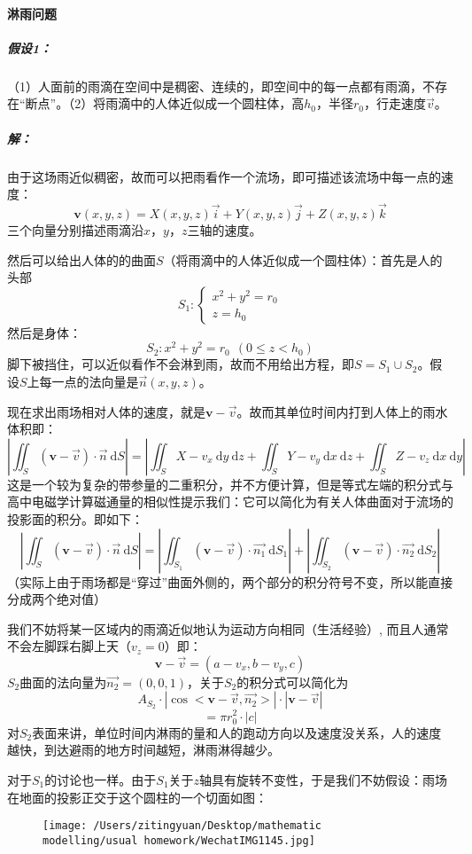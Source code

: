 \documentclass[UTF8]{ctexart}
\newcommand{\df}{\mathrm{~d}}
\begin{document}
\paragraph{淋雨问题}

\subparagraph{假设1：}（1）人面前的雨滴在空间中是稠密、连续的，即空间中的每一点都有雨滴，不存在“断点”。（2）将雨滴中的人体近似成一个圆柱体，高$h_0$，半径$r_0$，行走速度$\vec{v}$。

\subparagraph{解：}由于这场雨近似稠密，故而可以把雨看作一个流场，即可描述该流场中每一点的速度：
$$\mathbf{v}(x,y,z)=X(x,y,z)\vec{i}+Y(x,y,z)\vec{j}+Z(x,y,z)\vec{k}$$
三个向量分别描述雨滴沿$x$，$y$，$z$三轴的速度。

然后可以给出人体的的曲面$S$（将雨滴中的人体近似成一个圆柱体）：首先是人的头部
$$
S_1 :
\begin{cases}
    x^2+y^2=r_0\\
    z=h_0
\end{cases}
$$
然后是身体：
$$
S_2:
x^2+y^2=r_0 ~~ (0 \leqslant z < h_0)
$$
脚下被挡住，可以近似看作不会淋到雨，故而不用给出方程，即$S=S_1 \cup S_2$。假设$S$上每一点的法向量是$\vec{n}(x,y,z)$。

现在求出雨场相对人体的速度，就是$\mathbf{v}-\vec{v}$。故而其单位时间内打到人体上的雨水体积即：
$$
\left | \iint_{S}(\mathbf{v}-\vec{v}) \cdot \vec{n} \df S \right | = \left |\iint_S X-v_x \df y \df z + \iint_S Y-v_y \df x \df z + \iint_S Z-v_z \df x \df y \right |
$$
这是一个较为复杂的带参量的二重积分，并不方便计算，但是等式左端的积分式与高中电磁学计算磁通量的相似性提示我们：它可以简化为有关人体曲面对于流场的投影面的积分。即如下：
$$
\left | \iint_{S}(\mathbf{v}-\vec{v}) \cdot \vec{n} \df S \right | = \left | \iint_{S_1}(\mathbf{v}-\vec{v}) \cdot \vec{n_1} \df S_1 \right |+ \left |\iint_{S_2}(\mathbf{v}-\vec{v}) \cdot \vec{n_2} \df S_2  \right |
$$
（实际上由于雨场都是“穿过”曲面外侧的，两个部分的积分符号不变，所以能直接分成两个绝对值）

我们不妨将某一区域内的雨滴近似地认为运动方向相同（生活经验）, 而且人通常不会左脚踩右脚上天（$v_z=0$）即：
$$\mathbf{v}-\vec{v}=(a-v_x,b-v_y,c)$$
$S_2$曲面的法向量为$\vec{n_2}=(0,0,1)$，关于$S_2$的积分式可以简化为
$$
A_{S_2 }\cdot |\cos <\mathbf{v}-\vec{v},\vec{n_2 }>| \cdot |\mathbf{v}-\vec{v}|
$$
$$
=
\pi r_0^2 \cdot |c|
$$
对$S_2$表面来讲，单位时间内淋雨的量和人的跑动方向以及速度没关系，人的速度越快，到达避雨的地方时间越短，淋雨淋得越少。

对于$S_1$的讨论也一样。由于$S_1$关于$z$轴具有旋转不变性，于是我们不妨假设：雨场在地面的投影正交于这个圆柱的一个切面如图：
\begin{figure}[htbp]
    \texttt{[image: /Users/zitingyuan/Desktop/mathematic modelling/usual homework/WechatIMG1145.jpg]}
\end{figure}
\end{document}
